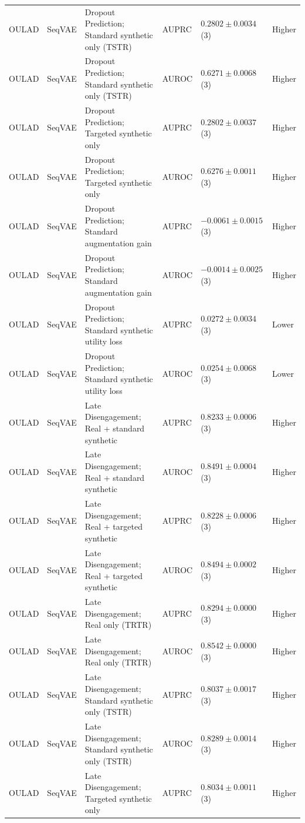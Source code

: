 \begin{longtable}{@{}p{2.25cm}p{2.05cm}p{4.7cm}p{5.0cm}p{2.6cm}p{1.25cm}@{}}
OULAD & SeqVAE & Dropout Prediction; Standard synthetic only (TSTR) & AUPRC & $0.2802 \mathbin{\pm} 0.0034$ (3) & Higher \\
OULAD & SeqVAE & Dropout Prediction; Standard synthetic only (TSTR) & AUROC & $0.6271 \mathbin{\pm} 0.0068$ (3) & Higher \\
OULAD & SeqVAE & Dropout Prediction; Targeted synthetic only & AUPRC & $0.2802 \mathbin{\pm} 0.0037$ (3) & Higher \\
OULAD & SeqVAE & Dropout Prediction; Targeted synthetic only & AUROC & $0.6276 \mathbin{\pm} 0.0011$ (3) & Higher \\
OULAD & SeqVAE & Dropout Prediction; Standard augmentation gain & AUPRC & $-0.0061 \mathbin{\pm} 0.0015$ (3) & Higher \\
OULAD & SeqVAE & Dropout Prediction; Standard augmentation gain & AUROC & $-0.0014 \mathbin{\pm} 0.0025$ (3) & Higher \\
OULAD & SeqVAE & Dropout Prediction; Standard synthetic utility loss & AUPRC & $0.0272 \mathbin{\pm} 0.0034$ (3) & Lower \\
OULAD & SeqVAE & Dropout Prediction; Standard synthetic utility loss & AUROC & $0.0254 \mathbin{\pm} 0.0068$ (3) & Lower \\
OULAD & SeqVAE & Late Disengagement; Real + standard synthetic & AUPRC & $0.8233 \mathbin{\pm} 0.0006$ (3) & Higher \\
OULAD & SeqVAE & Late Disengagement; Real + standard synthetic & AUROC & $0.8491 \mathbin{\pm} 0.0004$ (3) & Higher \\
OULAD & SeqVAE & Late Disengagement; Real + targeted synthetic & AUPRC & $0.8228 \mathbin{\pm} 0.0006$ (3) & Higher \\
OULAD & SeqVAE & Late Disengagement; Real + targeted synthetic & AUROC & $0.8494 \mathbin{\pm} 0.0002$ (3) & Higher \\
OULAD & SeqVAE & Late Disengagement; Real only (TRTR) & AUPRC & $0.8294 \mathbin{\pm} 0.0000$ (3) & Higher \\
OULAD & SeqVAE & Late Disengagement; Real only (TRTR) & AUROC & $0.8542 \mathbin{\pm} 0.0000$ (3) & Higher \\
OULAD & SeqVAE & Late Disengagement; Standard synthetic only (TSTR) & AUPRC & $0.8037 \mathbin{\pm} 0.0017$ (3) & Higher \\
OULAD & SeqVAE & Late Disengagement; Standard synthetic only (TSTR) & AUROC & $0.8289 \mathbin{\pm} 0.0014$ (3) & Higher \\
OULAD & SeqVAE & Late Disengagement; Targeted synthetic only & AUPRC & $0.8034 \mathbin{\pm} 0.0011$ (3) & Higher \\

\end{longtable}
